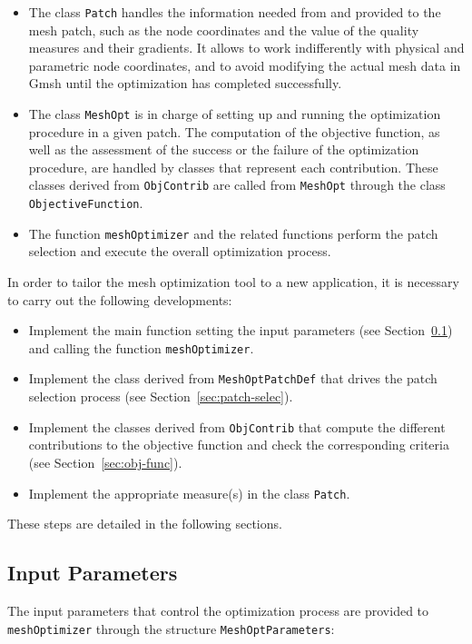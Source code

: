 \documentclass[12pt,a4paper,a4wide]{article}
\begin{document}
\begin{itemize}
\item The class \texttt{Patch} handles the information needed from
and provided to the mesh patch, such as the node coordinates and the
value of the quality measures and their gradients. It allows to work
indifferently with physical and parametric node coordinates, and to
avoid modifying the actual mesh data in Gmsh until the optimization
has completed successfully.
\item The class \texttt{MeshOpt} is in charge of setting up and
running the optimization procedure in a given patch. The computation
of the objective function, as well as the assessment of the success
or the failure of the optimization procedure, are handled by classes
that represent each contribution. These classes derived from
\texttt{ObjContrib} are called from \texttt{MeshOpt} through the
class \texttt{ObjectiveFunction}.
\item The function \texttt{meshOptimizer} and the related functions
perform the patch selection and execute the overall optimization
process.
\end{itemize}

In order to tailor the mesh optimization tool to a new application, it
is necessary to carry out the following developments:
\begin{itemize}
\item Implement the main function setting the input parameters (see
Section~\ref{sec:input-param}) and calling the function
\texttt{meshOptimizer}.
\item Implement the class derived from \texttt{MeshOptPatchDef}
that drives the patch selection process (see
Section~\ref{sec:patch-selec}).
\item Implement the classes derived from \texttt{ObjContrib} that
compute the different contributions to the objective function and
check the corresponding criteria (see Section~\ref{sec:obj-func}).
\item Implement the appropriate measure(s) in the class
\texttt{Patch}.
\end{itemize}

These steps are detailed in the following sections.

\subsection{Input Parameters}\label{sec:input-param}

The input parameters that control the optimization process are
provided to \texttt{meshOptimizer} through the structure
\texttt{MeshOptParameters}:
\end{document}
